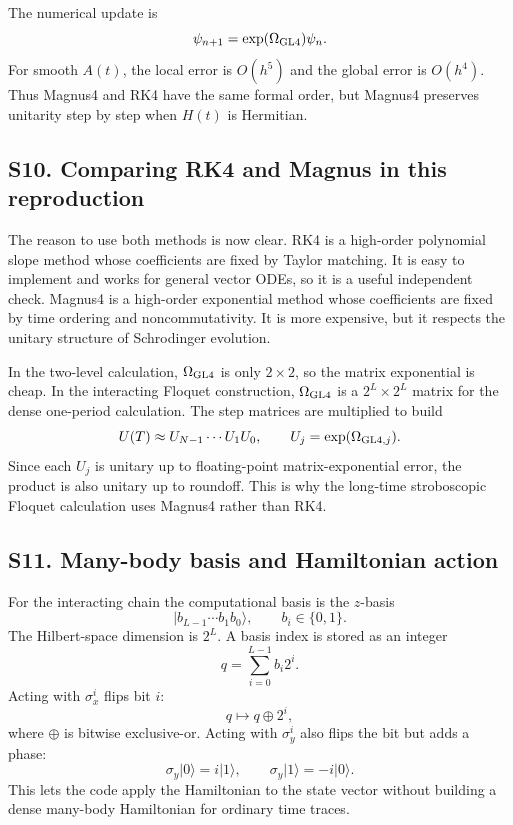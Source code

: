 \documentclass[aps,pra,preprint,superscriptaddress,nofootinbib]{revtex4-2}
\begin{document}
The numerical update is
\begin{equation}
\psi_{n+1}=\exp(\Omega_{\rm GL4})\psi_n.
\end{equation}
For smooth \(A(t)\), the local error is \(O(h^5)\) and the global error is \(O(h^4)\). Thus Magnus4 and RK4 have the same formal order, but Magnus4 preserves unitarity step by step when \(H(t)\) is Hermitian.

\subsection*{S10. Comparing RK4 and Magnus in this reproduction}

The reason to use both methods is now clear. RK4 is a high-order polynomial slope method whose coefficients are fixed by Taylor matching. It is easy to implement and works for general vector ODEs, so it is a useful independent check. Magnus4 is a high-order exponential method whose coefficients are fixed by time ordering and noncommutativity. It is more expensive, but it respects the unitary structure of Schrodinger evolution.

In the two-level calculation, \(\Omega_{\rm GL4}\) is only \(2\times2\), so the matrix exponential is cheap. In the interacting Floquet construction, \(\Omega_{\rm GL4}\) is a \(2^L\times2^L\) matrix for the dense one-period calculation. The step matrices are multiplied to build
\begin{equation}
U(T)\approx U_{N-1}\cdots U_1U_0,\qquad
U_j=\exp(\Omega_{{\rm GL4},j}).
\end{equation}
Since each \(U_j\) is unitary up to floating-point matrix-exponential error, the product is also unitary up to roundoff. This is why the long-time stroboscopic Floquet calculation uses Magnus4 rather than RK4.

\subsection*{S11. Many-body basis and Hamiltonian action}

For the interacting chain the computational basis is the \(z\)-basis
\begin{equation}
|b_{L-1}\cdots b_1b_0\rangle,\qquad b_i\in\{0,1\}.
\end{equation}
The Hilbert-space dimension is \(2^L\). A basis index is stored as an integer
\begin{equation}
q=\sum_{i=0}^{L-1}b_i2^i.
\end{equation}
Acting with \(\sigma_x^i\) flips bit \(i\):
\begin{equation}
q\mapsto q\oplus 2^i,
\end{equation}
where \(\oplus\) is bitwise exclusive-or. Acting with \(\sigma_y^i\) also flips the bit but adds a phase:
\begin{equation}
\sigma_y|0\rangle=i|1\rangle,\qquad
\sigma_y|1\rangle=-i|0\rangle.
\end{equation}
This lets the code apply the Hamiltonian to the state vector without building a dense many-body Hamiltonian for ordinary time traces.
\end{document}
